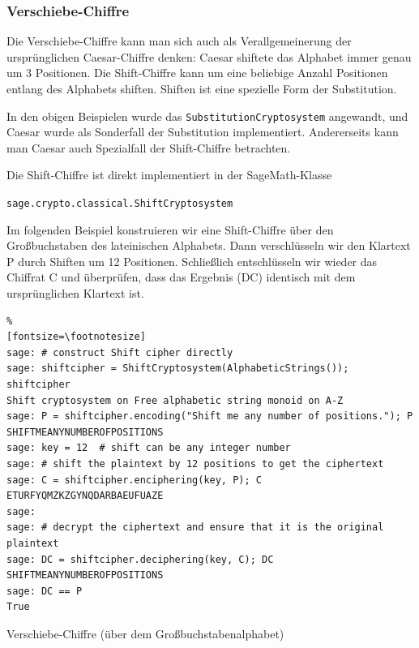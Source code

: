 \begin{refsegment}
\subsubsection{Verschiebe-Chiffre}

Die Verschiebe-Chiffre kann man sich auch als Verallgemeinerung der ursprünglichen
Caesar-Chiffre denken: Caesar shiftete das Alphabet immer genau um 3 Positionen.
Die Shift-Chiffre kann um eine beliebige Anzahl Positionen entlang des
Alphabets shiften. Shiften ist eine spezielle Form der Substitution.

In den obigen Beispielen wurde das \verb!SubstitutionCryptosystem! angewandt, und
Caesar wurde als Sonderfall der Substitution implementiert. Andererseits
kann man Caesar auch Spezialfall der Shift-Chiffre betrachten.

Die Shift-Chiffre  ist direkt implementiert in der SageMath-Klasse
\begin{center}
\verb!sage.crypto.classical.ShiftCryptosystem!
\end{center}

Im folgenden Beispiel konstruieren wir eine Shift-Chiffre über den Großbuchstaben
des lateinischen Alphabets. Dann verschlüsseln wir den Klartext P durch Shiften
um 12 Positionen. Schließlich entschlüsseln wir wieder das Chiffrat C und überprüfen,
dass das Ergebnis (DC) identisch mit dem ursprünglichen Klartext ist.

\begin{sagecode}
\begin{Verbatim}%
[fontsize=\footnotesize]
sage: # construct Shift cipher directly
sage: shiftcipher = ShiftCryptosystem(AlphabeticStrings()); shiftcipher
Shift cryptosystem on Free alphabetic string monoid on A-Z
sage: P = shiftcipher.encoding("Shift me any number of positions."); P
SHIFTMEANYNUMBEROFPOSITIONS
sage: key = 12  # shift can be any integer number
sage: # shift the plaintext by 12 positions to get the ciphertext
sage: C = shiftcipher.enciphering(key, P); C
ETURFYQMZKZGYNQDARBAEUFUAZE
sage:
sage: # decrypt the ciphertext and ensure that it is the original plaintext
sage: DC = shiftcipher.deciphering(key, C); DC
SHIFTMEANYNUMBEROFPOSITIONS
sage: DC == P
True
\end{Verbatim}
\caption{Verschiebe-Chiffre (über dem Großbuchstabenalphabet)}
\label{paper_pencil:shift_cipher:Sage_example}
\end{sagecode}


\end{refsegment}
